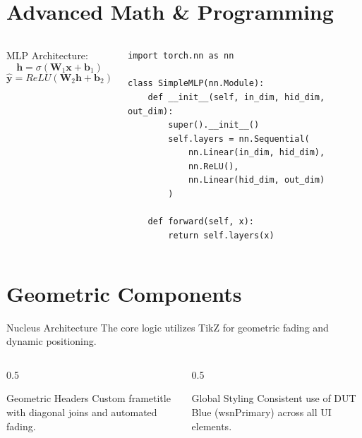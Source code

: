 \documentclass[aspectratio=169]{ctexbeamer}
\begin{document}
\section{Advanced Math \& Programming}
\begin{frame}[fragile]{\insertsectionhead}
    \begin{columns}
        MLP Architecture:
        \begin{equation}
            \mathbf{h} = \sigma(\mathbf{W}_1 \mathbf{x} + \mathbf{b}_1)
        \end{equation}
        \begin{equation}
            \hat{\mathbf{y}} = ReLU(\mathbf{W}_2 \mathbf{h} + \mathbf{b}_2)
        \end{equation}
        \begin{verbatim}
import torch.nn as nn

class SimpleMLP(nn.Module):
    def __init__(self, in_dim, hid_dim, out_dim):
        super().__init__()
        self.layers = nn.Sequential(
            nn.Linear(in_dim, hid_dim),
            nn.ReLU(),
            nn.Linear(hid_dim, out_dim)
        )

    def forward(self, x):
        return self.layers(x)
        \end{verbatim}
    \end{columns}
\end{frame}

\section{Geometric Components}
\begin{frame}{\insertsectionhead}
    \begin{block}{Nucleus Architecture}
        The core logic utilizes TikZ for geometric fading and dynamic positioning.
    \end{block}

    \begin{columns}
        \begin{column}{0.5\textwidth}
            \begin{exampleblock}{Geometric Headers}
                Custom frametitle with diagonal joins and automated fading.
            \end{exampleblock}
        \end{column}
        \begin{column}{0.5\textwidth}
            \begin{alertblock}{Global Styling}
                Consistent use of DUT Blue (wsnPrimary) across all UI elements.
            \end{alertblock}
        \end{column}
    \end{columns}
\end{frame}
\end{document}
